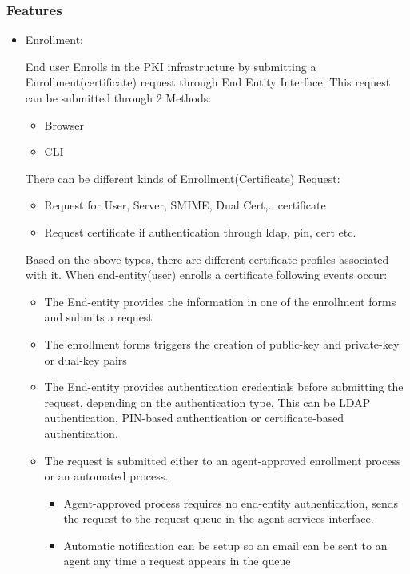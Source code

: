 \documentclass[a4paper]{article}
\begin{document}
\subsubsection{Features}
    \begin{itemize}
        \item Enrollment:

            End user Enrolls in the PKI infrastructure by submitting a Enrollment(certificate) request through End Entity Interface.
            This request can be submitted through 2 Methods:
            \begin{itemize}
                \item Browser
                \item CLI
            \end{itemize}
            There can be different kinds of Enrollment(Certificate) Request:
            \begin{itemize}
                \item Request for User, Server, SMIME, Dual Cert,.. certificate
                \item Request certificate if authentication through ldap, pin, cert etc. 
            \end{itemize}
            Based on the above types, there are different certificate profiles associated with it. 
            When end-entity(user) enrolls a certificate following events occur:
            \begin{itemize}
                \item The End-entity provides the information in one of the enrollment forms and submits a request
                \item The enrollment forms triggers the creation of public-key and private-key or dual-key pairs
                \item The End-entity provides authentication credentials before submitting the request,
                     depending on the authentication type. This can be LDAP authentication, PIN-based authentication or certificate-based authentication.
                \item The request is submitted either to an agent-approved enrollment process or an automated process.
                    \begin{itemize}
                        \item Agent-approved process requires no end-entity authentication, sends the request to the request queue in the agent-services interface.
                        \item Automatic notification can be setup so an email can be sent to an agent any time a request appears in the queue

\end{itemize}
\end{itemize}
\end{itemize}
\end{document}
